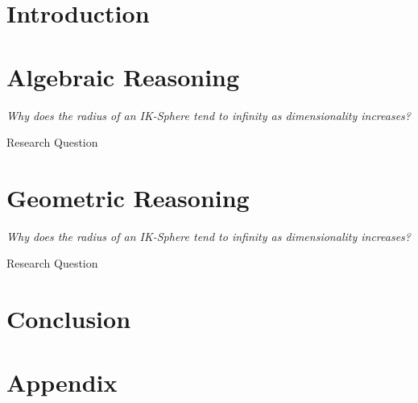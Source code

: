 \documentclass[a4paper, 12pt]{report}
\theoremstyle{definition}
\begin{document}
    
    
    
    \singlespacing
    
    \doublespacing
    
    
    \chapter{Introduction}
    
    
    \chapter{Algebraic Reasoning}
    \epigraph{\textit{Why does the radius of an IK-Sphere tend to infinity as dimensionality increases?}}{Research Question}
    
    
    \chapter{Geometric Reasoning}
    \epigraph{\textit{Why does the radius of an IK-Sphere tend to infinity as dimensionality increases?}}{Research Question}
    
    
    \chapter{Conclusion}
    
    
    \printbibliography
    
    \appendix
    \chapter{Appendix}
    
\end{document}

